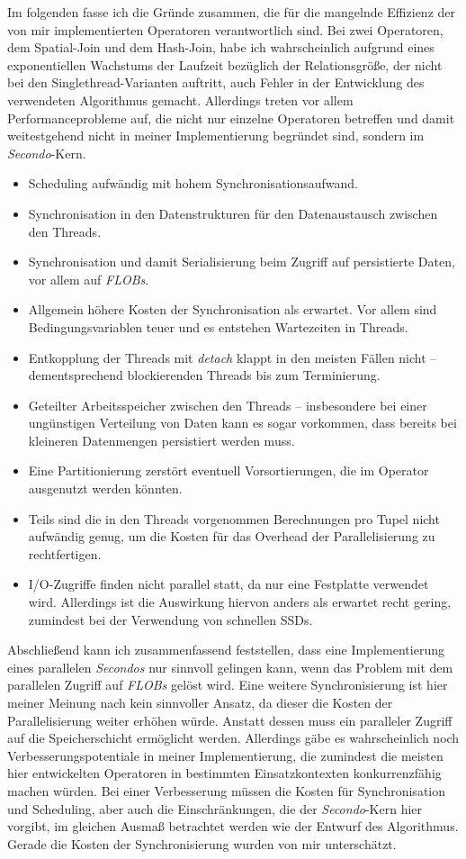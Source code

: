 \documentclass[a4paper,12pt,twoside]{article}
\newcommand{\Fb}[1]{\textit{#1}} %
\begin{document}
Im folgenden fasse ich die Gründe zusammen, die für die mangelnde Effizienz der von mir implementierten Operatoren verantwortlich sind. Bei zwei Operatoren, dem Spatial-Join und dem Hash-Join, habe ich wahrscheinlich aufgrund eines exponentiellen Wachstums der Laufzeit bezüglich der Relationsgröße, der nicht bei den Singlethread-Varianten auftritt, auch Fehler in der Entwicklung des verwendeten Algorithmus gemacht. Allerdings treten vor allem Performanceprobleme auf, die nicht nur einzelne Operatoren betreffen und damit weitestgehend nicht in meiner Implementierung begründet sind, sondern im \Fb{Secondo}-Kern.

\begin{itemize}
	\item Scheduling aufwändig mit hohem Synchronisationsaufwand.
	\item Synchronisation in den Datenstrukturen für den Datenaustausch zwischen den Threads.
	\item Synchronisation und damit Serialisierung beim Zugriff auf persistierte Daten, vor allem auf \Fb{FLOBs}.
	\item Allgemein höhere Kosten der Synchronisation als erwartet. Vor allem sind Bedingungsvariablen teuer und es entstehen Wartezeiten in Threads.
	\item Entkopplung der Threads mit \Fb{detach} klappt in den meisten Fällen nicht -- dementsprechend blockierenden Threads bis zum Terminierung.
	\item Geteilter Arbeitsspeicher zwischen den Threads -- insbesondere bei einer ungünstigen Verteilung von Daten kann es sogar vorkommen, dass bereits bei kleineren Datenmengen persistiert werden muss.
	\item Eine Partitionierung zerstört eventuell Vorsortierungen, die im Operator ausgenutzt werden könnten.
	\item Teils sind die in den Threads vorgenommen Berechnungen pro Tupel nicht aufwändig genug, um die Kosten für das Overhead der Parallelisierung zu rechtfertigen.
	\item I/O-Zugriffe finden nicht parallel statt, da nur eine Festplatte verwendet wird. Allerdings ist die Auswirkung hiervon anders als erwartet recht gering, zumindest bei der Verwendung von schnellen SSDs.
\end{itemize}
 
Abschließend kann ich zusammenfassend feststellen, dass eine Implementierung eines parallelen \Fb{Secondos} nur sinnvoll gelingen kann, wenn das Problem mit dem parallelen Zugriff auf \Fb{FLOBs} gelöst wird. Eine weitere Synchronisierung ist hier meiner Meinung nach kein sinnvoller Ansatz, da dieser die Kosten der Parallelisierung weiter erhöhen würde. Anstatt dessen muss ein paralleler Zugriff auf die Speicherschicht ermöglicht werden. Allerdings gäbe es wahrscheinlich noch Verbesserungspotentiale in meiner Implementierung, die zumindest die meisten hier entwickelten Operatoren in bestimmten Einsatzkontexten konkurrenzfähig machen würden. Bei einer Verbesserung müssen die Kosten für Synchronisation und Scheduling, aber auch die Einschränkungen, die der \Fb{Secondo}-Kern hier vorgibt, im gleichen Ausmaß betrachtet werden wie der Entwurf des Algorithmus. Gerade die Kosten der Synchronisierung wurden von mir unterschätzt.

\pagebreak 
\printbibliography[notcategory=nicht-in-bib]
\end{document}

